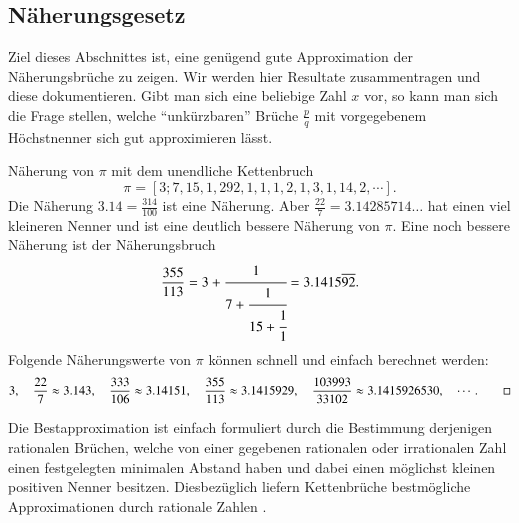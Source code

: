 \subsection{Näherungsgesetz}
Ziel dieses Abschnittes ist, eine genügend gute Approximation der
Näherungsbrüche zu zeigen. Wir werden hier Resultate zusammentragen und 
diese dokumentieren. Gibt man sich eine beliebige Zahl $x$
vor, so kann man sich die Frage stellen, welche ``unkürzbaren'' Brüche
$\frac{p}{q}$ mit vorgegebenem Höchstnenner sich gut approximieren
lässt. 
\begin{beispiel}
Näherung von $\pi$ mit dem unendliche Kettenbruch
\[
\pi
=
[3;7,15,1,292,1,1,1,2,1,3,1,14,2,\cdots].
\]
Die Näherung $3.14 = \frac{314}{100}$ ist eine Näherung.
Aber $\frac{22}{7} = 3.14285714\dots$ hat einen viel kleineren Nenner und
ist eine deutlich bessere Näherung von $\pi$.
Eine noch bessere Näherung ist der Näherungsbruch
\begin{equation}
\frac{355}{113}
=
3 + \cfrac{1}{7+\cfrac{1}{15+\cfrac{1}{1}}}
=
3.1415\overline{92}.
\end{equation}
Folgende Näherungswerte von $\pi$ können schnell und einfach berechnet werden:
\begin{equation*}
3, \quad
\frac{22}{7} \approx 3.143, \quad
\frac{333}{106} \approx 3.14151, \quad
\frac{355}{113} \approx 3.1415929, \quad
\frac{103993}{33102} \approx 3.1415926530, \quad
\cdots.
\qedhere
\end{equation*}
\end{beispiel}
Die Bestapproximation ist einfach formuliert durch die Bestimmung
derjenigen rationalen Brüchen, welche von einer gegebenen rationalen
oder irrationalen Zahl einen festgelegten minimalen Abstand haben
und dabei einen möglichst kleinen positiven Nenner besitzen. Diesbezüglich liefern Kettenbrüche
bestmögliche Approximationen durch rationale Zahlen
\cite{kettenbruch:numerical-analysis}.

